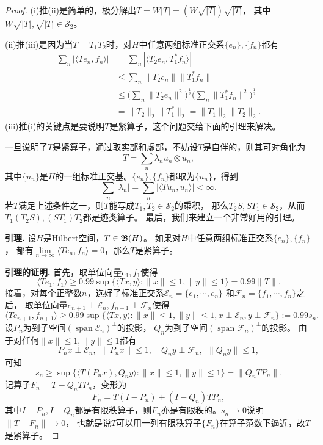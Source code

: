 \begin{proof}
    (i)推(ii)是简单的，极分解出$T=W|T|=(W\!\sqrt{|T|})\sqrt{|T|}$，
    其中$W\!\sqrt{|T|},\sqrt{|T|}\in\mathcal{S}_2$。

    (ii)推(iii)是因为当$T=T_1T_2$时，对$H$中任意两组标准正交系$\{e_n\},\{f_n\}$都有
    \begin{align*}
        \sum_n|\langle Te_n,f_n \rangle|
        &=\sum_n|\langle T_2e_n,T_1^*f_n \rangle|\\
        &\leqslant\sum_n\|T_2e_n\|\|T_1^*f_n\|\\
        &\leqslant\bigg(\sum_n\|T_2e_n\|^2\bigg)^\frac{1}{2}
        \bigg(\sum_n\|T_1^*f_n\|^2\bigg)^\frac{1}{2}\\
        &=\|T_2\|_2\|T_1^*\|_2=\|T_1\|_2\|T_2\|_2.
    \end{align*}
    (iii)推(i)的关键点是要说明$T$是紧算子，这个问题交给下面的引理来解决。

    一旦说明了$T$是紧算子，通过取实部和虚部，不妨设$T$是自伴的，则其可对角化为
    \[T=\sum_n\lambda_nu_n \otimes u_n,\]
    其中$\{u_n\}$是$H$的一组标准正交基。$\{e_n\},\{f_n\}$都取为$\{u_n\}$，得到
    \[\sum_n|\lambda_n|=\sum_n|\langle Tu_n,u_n\rangle|<\infty.\]
    若$T$满足上述条件之一，则$T$能写成$T_1,T_2\in\mathcal{S}_2$的乘积，
    那么$T_2S,ST_1\in\mathcal{S}_2$，从而$T_1(T_2S),(ST_1)T_2$都是迹类算子。
    最后，我们来建立一个非常好用的引理。

    \textbf{引理.} 设$H$是Hilbert空间，$T\in\mathfrak{B}(H)$。
    如果对$H$中任意两组标准正交系$\{e_n\},\{f_n\}$，
    都有$\lim\limits_{n\to\infty}\langle Te_n,f_n \rangle=0$，那么$T$是紧算子。

    \textbf{引理的证明.} 首先，取单位向量$e_1,f_1$使得
    \[\langle Te_1,f_1 \rangle
    \geqslant0.99\sup\{\langle Tx,y \rangle:\|x\|\leqslant1,\|y\|\leqslant1\}=0.99\|T\|.\]
    接着，对每个正整数$n$，选好了标准正交系$\mathcal{E}_n=\{e_1,\cdots,e_n\}$
    和$\mathcal{F}_n=\{f_1,\cdots,f_n\}$之后，
    取单位向量$e_{n+1}\perp\mathcal{E}_n,f_{n+1}\perp\mathcal{F}_n$使得
    \[\langle Te_{n+1},f_{n+1} \rangle
    \geqslant0.99\sup\{\langle Tx,y \rangle:\|x\|\leqslant1,\|y\|\leqslant1,
    x\perp\mathcal{E}_n,y\perp\mathcal{F}_n\}:=0.99s_n.\]
    设$P_n$为到子空间$(\operatorname{span}\mathcal{E}_n)^\perp$的投影，
    $Q_n$为到子空间$(\operatorname{span}\mathcal{F}_n)^\perp$的投影。
    由于对任何$\|x\|\leqslant1,\|y\|\leqslant1$都有
    \[P_nx\perp\mathcal{E}_n,\ \ \|P_nx\|\leqslant1,\quad
    Q_ny\perp\mathcal{F}_n,\ \ \|Q_ny\|\leqslant1,\]
    可知
    \[s_n\geqslant\sup\{\langle T(P_nx),Q_ny \rangle:
    \|x\|\leqslant1,\|y\|\leqslant1\}=\|Q_nTP_n\|.\]
    记算子$F_n=T-Q_nTP_n$，变形为
    \[F_n=T(I-P_n)+(I-Q_n)TP_n,\]
    其中$I-P_n,I-Q_n$都是有限秩算子，则$F_n$亦是有限秩的。$s_n\to0$说明$\|T-F_n\|\to0$，
    也就是说$T$可以用一列有限秩算子$\{F_n\}$在算子范数下逼近，故$T$是紧算子。
\end{proof}

